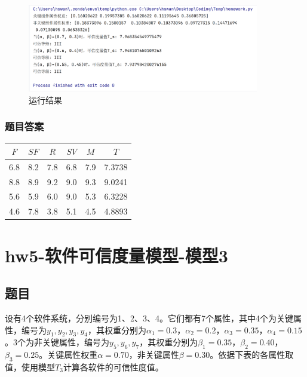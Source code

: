 \documentclass{article}
\begin{document}
\begin{figure}[H]
	\centering
	\includegraphics[width=0.9\textwidth]{img/1.png}
	\caption{运行结果}
\end{figure}

\subsubsection{题目答案}

\begin{center}
	\begin{tabular}{|c|c|c|c|c|c|}
		\hline
		$ F $ & $ SF $ & $ R $ & $ SV $ & $ M $ & $ T $ \\ \hline
		6.8     & 8.2      & 7.8     & 6.8      & 7.9     & 7.3738        \\ \hline
		8.8     & 8.9      & 9.2     & 9.0      & 9.3     & 9.0241        \\ \hline
		5.6     & 5.9      & 6.0     & 9.0      & 5.3     & 6.3228        \\ \hline
		4.6     & 7.8      & 3.8     & 5.1      & 4.5     & 4.8893        \\ \hline
	\end{tabular}
\end{center}









\section{hw5-软件可信度量模型-模型3}

\subsection{题目}

设有4个软件系统，分别编号为1、2、3、4。它们都有7个属性，其中4个为关键属性，编号为$y_1,y_2,y_3,y_4$，其权重分别为$\alpha_1 = 0.3$，$\alpha_2 = 0.2$，$\alpha_3 = 0.35$，$\alpha_4 = 0.15$。3个为非关键属性，编号为$y_5,y_6,y_7$，其权重分别为$\beta_1 = 0.35$，$\beta_2 = 0.40$，$\beta_3 = 0.25$。关键属性权重$\alpha = 0.70$，非关键属性$\beta = 0.30$。依据下表的各属性取值，使用模型$T_3$计算各软件的可信性度值。
\end{document}
